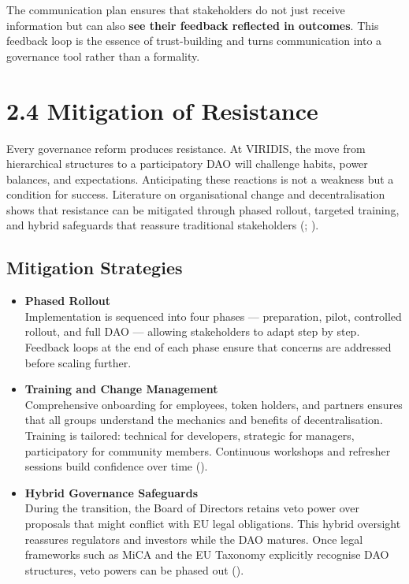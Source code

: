 \documentclass[
  english,
  12pt,
  oneside,
  open=any]{scrbook}
\begin{document}
The communication plan ensures that stakeholders do not just receive
information but can also \textbf{see their feedback reflected in
outcomes}. This feedback loop is the essence of trust-building and turns
communication into a governance tool rather than a formality.

\section{2.4 Mitigation of Resistance}\label{sec-resistance}

Every governance reform produces resistance. At VIRIDIS, the move from
hierarchical structures to a participatory DAO will challenge habits,
power balances, and expectations. Anticipating these reactions is not a
weakness but a condition for success. Literature on organisational
change and decentralisation shows that resistance can be mitigated
through phased rollout, targeted training, and hybrid safeguards that
reassure traditional stakeholders
(;
).

\subsection{Mitigation Strategies}\label{mitigation-strategies}

\begin{itemize}
\item
  \textbf{Phased Rollout}\\
  Implementation is sequenced into four phases --- preparation, pilot,
  controlled rollout, and full DAO --- allowing stakeholders to adapt
  step by step. Feedback loops at the end of each phase ensure that
  concerns are addressed before scaling further.
\item
  \textbf{Training and Change Management}\\
  Comprehensive onboarding for employees, token holders, and partners
  ensures that all groups understand the mechanics and benefits of
  decentralisation. Training is tailored: technical for developers,
  strategic for managers, participatory for community members.
  Continuous workshops and refresher sessions build confidence over time
  ().
\item
  \textbf{Hybrid Governance Safeguards}\\
  During the transition, the Board of Directors retains veto power over
  proposals that might conflict with EU legal obligations. This hybrid
  oversight reassures regulators and investors while the DAO matures.
  Once legal frameworks such as MiCA and the EU Taxonomy explicitly
  recognise DAO structures, veto powers can be phased out
  ().
\end{itemize}
\end{document}
